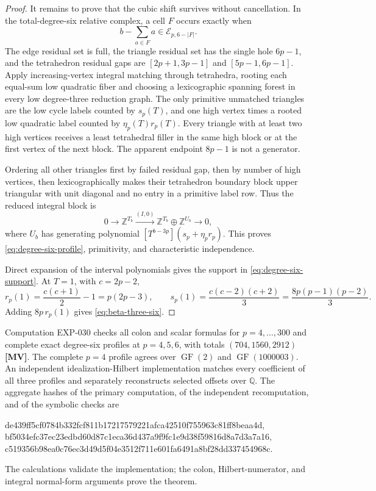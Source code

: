 \documentclass[11pt]{article}
\theoremstyle{definition}
\theoremstyle{remark}
\begin{document}
\begin{proof}
It remains to prove that the cubic shift survives without cancellation. In the total-degree-six
relative complex, a cell $F$ occurs exactly when
\[
b-\sum_{a\in F}a\in\mathcal E_{p,6-|F|}.
\]
The edge residual set is full, the triangle residual set has the single hole $6p-1$, and the
tetrahedron residual gaps are $[2p+1,3p-1]$ and $[5p-1,6p-1]$. Apply increasing-vertex
integral matching through tetrahedra, rooting each equal-sum low quadratic fiber and choosing a
lexicographic spanning forest in every low degree-three reduction graph. The only primitive
unmatched triangles are the low cycle labels counted by $s_p(T)$, and one high vertex times a
rooted low quadratic label counted by $\eta_p(T)r_p(T)$. Every triangle with at least two high
vertices receives a least tetrahedral filler in the same high block or at the first vertex of the
next block. The apparent endpoint $8p-1$ is not a generator.

Ordering all other triangles first by failed residual gap, then by number of high vertices, then
lexicographically makes their tetrahedron boundary block upper triangular with unit diagonal and
no entry in a primitive label row. Thus the reduced integral block is
\[
0\longrightarrow\mathbb Z^{T_b}
\xrightarrow{(I,0)}\mathbb Z^{T_b}\oplus\mathbb Z^{U_b}
\longrightarrow0,
\]
where $U_b$ has generating polynomial
$[T^{b-3p}](s_p+\eta_pr_p)$. This proves \eqref{eq:degree-six-profile}, primitivity, and
characteristic independence.

Direct expansion of the interval polynomials gives the support in
\eqref{eq:degree-six-support}. At $T=1$, with $c=2p-2$,
\[
r_p(1)=\frac{c(c+1)}2-1=p(2p-3),\qquad
s_p(1)=\frac{c(c-2)(c+2)}3=\frac{8p(p-1)(p-2)}3.
\]
Adding $8p\,r_p(1)$ gives \eqref{eq:beta-three-six}.
\end{proof}

Computation EXP-030 checks all colon and scalar formulas for $p=4,\ldots,300$ and complete exact
degree-six profiles at $p=4,5,6$, with totals $(704,1560,2912)$ \textbf{[MV]}. The complete $p=4$
profile agrees over $\operatorname{GF}(2)$ and $\operatorname{GF}(1000003)$. An independent
idealization-Hilbert implementation matches every coefficient of all three profiles and separately
reconstructs selected offsets over $\mathbb Q$. The aggregate hashes of the primary computation,
of the independent recomputation, and of the symbolic checks are
\begin{center}
{\fontsize{7}{8}\selectfont\ttfamily de439ff5cf0784b332fcf811b17217579221afca42510f755963c81ff8beaa4d},\\
{\fontsize{7}{8}\selectfont\ttfamily bf5034efc37ec23edbd60d87c1eca36d437a9f9fc1e9d38f59816d8a7d3a7a16},\\
{\fontsize{7}{8}\selectfont\ttfamily c519356b98ea0c76ec3d49d5f04e3512f711e601fa6491a8bf28dd337454968c}.
\end{center}
The calculations validate the implementation; the colon, Hilbert-numerator, and integral
normal-form arguments prove the theorem.
\end{document}
